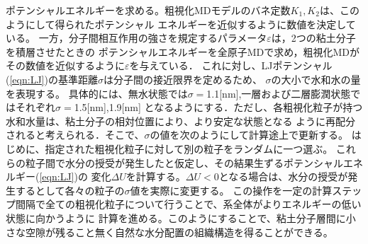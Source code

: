 ﻿\documentclass[11pt,a4j]{jarticle}
\begin{document}
ポテンシャルエネルギーを求める。粗視化MDモデルのバネ定数$K_1, K_2$は、このようにして得られたポテンシャル
エネルギーを近似するように数値を決定している。
一方，分子間相互作用の強さを規定するパラメータ$\varepsilon$は，2つの粘土分子を積層させたときの
ポテンシャルエネルギーを全原子MDで求め，粗視化MDがその数値を近似するように$\varepsilon$を与えている．
これに対し、LJポテンシャル(\ref{eqn:LJ})の基準距離$\sigma$は分子間の接近限界を定めるため、
$\sigma$の大小で水和水の量を表現する。
具体的には、無水状態では$\sigma=$1.1[nm],一層および二層膨潤状態ではそれぞれ$\sigma=$1.5[nm],1.9[nm]
となるようにする．ただし、各粗視化粒子が持つ水和水量は、粘土分子の相対位置により、より安定な状態となる
ように再配分されると考えられる．そこで、$\sigma$の値を次のようにして計算途上で更新する。
はじめに、指定された粗視化粒子に対して別の粒子をランダムに一つ選ぶ。
これらの粒子間で水分の授受が発生したと仮定し、その結果生ずるポテンシャルエネルギー(\ref{eqn:LJ})の
変化$\Delta U$を計算する。$\Delta U<0$となる場合は、水分の授受が発生するとして各々の粒子の$\sigma$値を実際に変更する。
この操作を一定の計算ステップ間隔で全ての粗視化粒子について行うことで、系全体がよりエネルギーの低い状態に向かうように
計算を進める。このようにすることで、粘土分子層間に小さな空隙が残ること無く自然な水分配置の組織構造を得ることができる。
\end{document}
